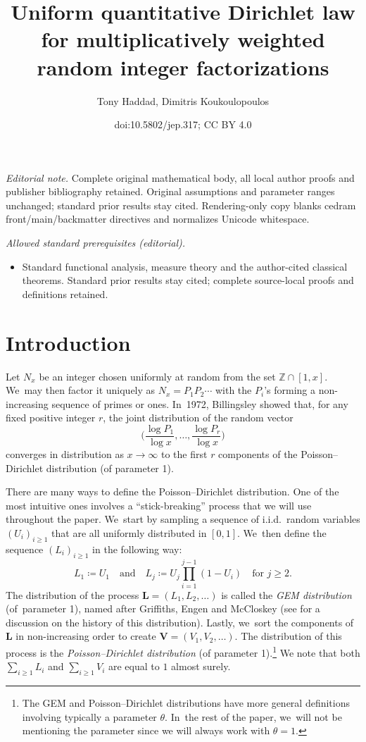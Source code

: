 \documentclass[10pt]{amsart}
\title{Uniform quantitative Dirichlet law for multiplicatively weighted random integer factorizations}
\author{Tony Haddad, Dimitris Koukoulopoulos}
\date{doi:10.5802/jep.317; CC BY 4.0}
\newcommand{\bL}{{\boldsymbol L}}
\newcommand{\bV}{{\boldsymbol V}}
\newcommand{\ZZ}{\mathbb{Z}}
\newcommand{\bgg}{\Big}
\theoremstyle{plain}
\theoremstyle{definition}
\begin{document}
\maketitle
\noindent\textit{Editorial note.} Complete original mathematical body, all local author proofs and publisher bibliography retained. Original assumptions and parameter ranges unchanged; standard prior results stay cited. Rendering-only copy blanks cedram front/main/backmatter directives and normalizes Unicode whitespace.\par\medskip
\noindent\textit{Allowed standard prerequisites (editorial).}\begin{itemize}
\item Standard functional analysis, measure theory and the author-cited classical theorems. Standard prior results stay cited; complete source-local proofs and definitions retained.
\end{itemize}\medskip
\tableofcontents


\section{Introduction}
\label{sec:intro}

Let $N_x$ be an integer chosen uniformly at random from the set $\ZZ \cap [1, x]$. We~may then factor it uniquely as $N_x = P_1P_2 \cdots$ with the $P_i$'s forming a non-increasing sequence of primes or ones. In~1972, Billingsley \cite{Bill72} showed that, for any fixed positive integer $r$, the joint distribution of the random vector
\[
\bgg(\frac{\log P_1}{\log x}, \ldots, \frac{\log P_r}{\log x}\bgg)
\]
converges in distribution as $x \to \infty$ to the first $r$ components of the Poisson--Dirichlet distribution (of parameter 1).

There are many ways to define the Poisson--Dirichlet distribution. One of the most intuitive ones involves a ``stick-breaking'' process that we will use throughout the paper. We~start by sampling a sequence of i.i.d.~random variables $(U_i)_{i \ge 1}$ that are all uniformly distributed in $[0, 1]$. We~then define the sequence $(L_i)_{i \ge 1}$ in the following way:
\[
L_1 \coloneqq U_1 \quad \text{and}\quad L_j \coloneqq U_j \prod_{i=1}^{j-1} (1-U_i) \quad \text{for $j \ge 2$.}
\]
The distribution of the process $\bL = (L_1, L_2, \ldots)$ is called the \textit{GEM distribution} (of~parameter 1), named after Griffiths, Engen and McCloskey (see \cite[Ch.\,41]{JKB} for a discussion on the history of this distribution). Lastly, we~sort the components of $\bL$ in non-increasing order to create $\bV = (V_1, V_2, \ldots)$. The distribution of this process is the \textit{Poisson--Dirichlet distribution} (of parameter 1).\footnote{The GEM and Poisson--Dirichlet distributions have more general definitions involving typically a parameter $\theta$. In~the rest of the paper, we~will not be mentioning the parameter since we will always work with $\theta = 1$.} We note that both $\sum_{i \ge 1} L_i$ and $\sum_{i \ge 1} V_i$ are equal to $1$ almost surely.
\end{document}
